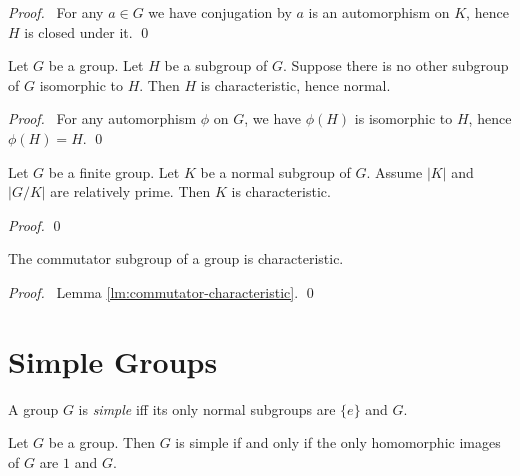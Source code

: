 \begin{proof}
\pf\ For any $a \in G$ we have conjugation by $a$ is an automorphism on $K$, hence $H$ is closed under it. \qed
\end{proof}

\begin{prop}
\label{prop:unique-subgroup-normal}
Let $G$ be a group. Let $H$ be a subgroup of $G$. Suppose there is no other subgroup of $G$ isomorphic to $H$. Then $H$ is characteristic, hence normal.
\end{prop}

\begin{proof}
\pf\ For any automorphism $\phi$ on $G$, we have $\phi(H)$ is isomorphic to $H$, hence $\phi(H) = H$. \qed
\end{proof}

\begin{prop}
\label{prop:K-GK-relatively-prime-K-characteristic}
Let $G$ be a finite group. Let $K$ be a normal subgroup of $G$. Assume $|K|$ and $|G/K|$ are relatively prime. Then $K$ is characteristic.
\end{prop}

\begin{proof}
\pf
{}
\qed
\end{proof}

\begin{prop}
The commutator subgroup of a group is characteristic.
\end{prop}

\begin{proof}
\pf\ Lemma \ref{lm:commutator-characteristic}. \qed
\end{proof}

\section{Simple Groups}

\begin{df}
A group $G$ is \emph{simple} iff its only normal subgroups are $\{e\}$ and $G$.
\end{df}

\begin{prop}
\label{prop:image_of_simple_group}
Let $G$ be a group. Then $G$ is simple if and only if the only homomorphic images of $G$ are $1$ and $G$.
\end{prop}

